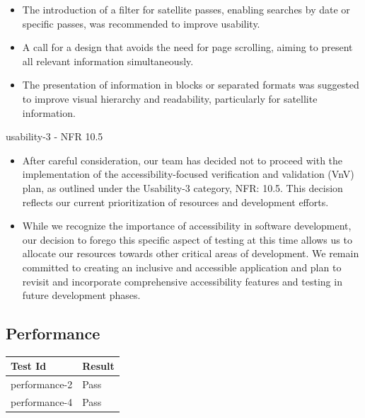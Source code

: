 \documentclass[12pt, titlepage]{article}
\begin{document}
\begin{itemize}
\begin{itemize}
\begin{itemize}
            \item The introduction of a filter for satellite passes, enabling searches by date or specific passes, was recommended to improve usability.
            \item A call for a design that avoids the need for page scrolling, aiming to present all relevant information simultaneously.
            \item The presentation of information in blocks or separated formats was suggested to improve visual hierarchy and readability, particularly for satellite information.
        \end{itemize}
    \end{itemize}
\end{itemize}

usability-3 - NFR 10.5
\begin{itemize}
    \item After careful consideration, our team has decided not to proceed with the implementation of the accessibility-focused verification and validation (VnV) plan, as outlined under the Usability-3 category, NFR: 10.5. This decision reflects our current prioritization of resources and development efforts. 
    \item While we recognize the importance of accessibility in software development, our decision to forego this specific aspect of testing at this time allows us to allocate our resources towards other critical areas of development. We remain committed to creating an inclusive and accessible application and plan to revisit and incorporate comprehensive accessibility features and testing in future development phases. 
\end{itemize}
\subsection{Performance}

\begin{center}
\begin{tabular}{|p{4cm} | p{4cm}| }
\hline
\textbf{Test Id} & \textbf{Result} \\
\hline
performance-2 & Pass \\
\hline
performance-4 & Pass \\
\hline

\end{tabular}
\end{center}
\end{document}
